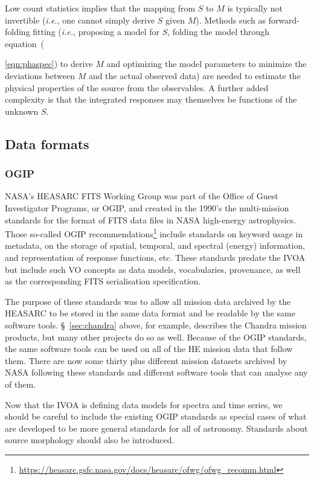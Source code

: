 \documentclass[11pt,a4paper]{ivoa}
\begin{document}
Low count statistics implies that the mapping from $S$ to $M$ is typically not invertible ({\em i.e.\/}, one cannot simply derive $S$ given $M$)\null.  Methods such as forward-folding fitting \citep{mattox:1996} ({\em i.e.\/}, proposing a model for $S$, folding the model through equation~({\ref{eqn:phaspec}) to derive $M$ and optimizing the model parameters to minimize the deviations between $M$ and the actual observed data) are needed to estimate the physical properties of the source from the observables.  A further added complexity is that the integrated responses may themselves be functions of the unknown $S$.

\subsection{Data formats}
\label{sec:data_formats}

\subsubsection{{OGIP}}\label{sec:ogip}

NASA's HEASARC FITS Working Group was part of the Office of Guest Investigator Programs, or OGIP, and created in the 1990's the multi-mission standards for the format of FITS data files in NASA high-energy astrophysics. Those so-called OGIP  recommendations\footnote{\url{https://heasarc.gsfc.nasa.gov/docs/heasarc/ofwg/ofwg_recomm.html}} include standards on keyword usage in metadata, on the storage of spatial, temporal, and spectral (energy) information, and representation of response functions, etc.  These standards predate the IVOA but include such VO concepts as data models, vocabularies, provenance, as well as the corresponding FITS serialisation specification.

The purpose of these standards was to allow all mission data archived by the HEASARC to be stored in the same data format
and be readable by the same software tools. \S~\ref{sec:chandra} above, for example, describes the Chandra mission products,
but many other projects do so as well. Because of the OGIP standards, the same software tools can be used on all of the HE
mission data that follow them. There are now some thirty plus different mission datasets archived by NASA following
these standards and different software tools that can analyse any of them.

Now that the IVOA is defining data models for spectra and time series, we should be careful to include the existing OGIP
standards as special cases of what are developed to be more general standards for all of astronomy. Standards about
source morphology should also be introduced.

}
\end{document}
